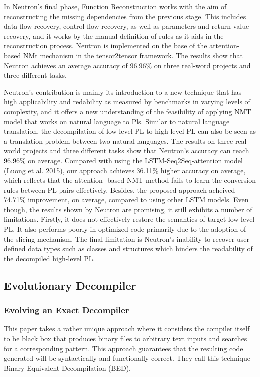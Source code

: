 \documentclass[conference,a4paper]{IEEEtran}
\begin{document}
In Neutron’s final phase, Function Reconstruction works with the aim of reconstructing the missing dependencies from the previous stage.
This includes data flow recovery, control flow recovery, as well as parameters and return value recovery, and it works by the manual definition of rules as it aids in the reconstruction process.
Neutron is implemented on the base of the attention-based NMt mechanism in the tensor2tensor framework. The results show that Neutron achieves an average accuracy of 96.96\% on three real-word projects and three different tasks.

Neutron’s contribution is mainly its introduction to a new technique that has high applicability and redability as measured by benchmarks in varying levels of complexity, and it offers a new understanding of the feasibility of applying NMT model that works on natural language to Pls.
Similar to natural language translation, the decompilation of low-level PL to high-level PL can also be seen as a translation problem between two natural languages.
The results on three real-world projects and three different tasks show that Neutron’s accuracy can reach 96.96\% on average.
Compared with using the LSTM-Seq2Seq-attention model (Luong et al. 2015), our approach achieves 36.11\% higher accuracy on average, which reflects that the attention- based NMT method fails to learn the conversion rules between PL pairs effectively.
Besides, the proposed approach acheived 74.71\% improvement, on average, compared to using other LSTM models.
Even though, the results shown by Neutron are promising, it still exhibits a number of limitations. Firstly, it does not effectively restore the semantics of target low-level PL.
It also performs poorly in optimized code primarily due to the adoption of the slicing mechanism.
The final limitation is Neutron’s inability to recover user-defined data types such as classes and structures which hinders the readability of the decompiled high-level PL.


\subsection{Evolutionary Decompiler}

\subsubsection{Evolving an Exact Decompiler}

This paper \cite{schulte_evolving_2018} takes a rather unique approach where it considers the compiler itself to be black box that produces binary files to arbitrary text inputs and searches for a corresponding pattern.
This approach guarantees that the resulting code generated will be syntactically and functionally correct.
They call this technique Binary Equivalent Decompilation (BED).
\end{document}
